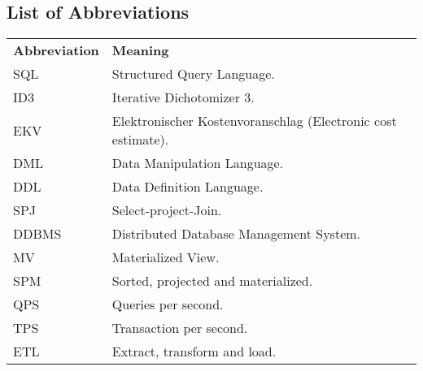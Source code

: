 
% 

\begin{center}
    \section*{List of Abbreviations}
\end{center}

\noindent %
\begin{minipage}{\textwidth}
\begin{tabular}{ll}
    \textbf{Abbreviation} & \textbf{Meaning} \\
    SQL & Structured Query Language. \\
    ID3 & Iterative  Dichotomizer 3. \\
    EKV & Elektronischer Kostenvoranschlag (Electronic cost estimate).\\
    DML & Data Manipulation Language. \\
    DDL & Data Definition Language.\\
    SPJ & Select-project-Join.\\
    DDBMS & Distributed Database Management System.\\
    MV & Materialized View.\\
    SPM & Sorted, projected and materialized.\\
    QPS & Queries per second.\\
    TPS & Transaction per second.\\
    ETL & Extract, transform and load. \\
\end{tabular}
\end{minipage}
% 

    